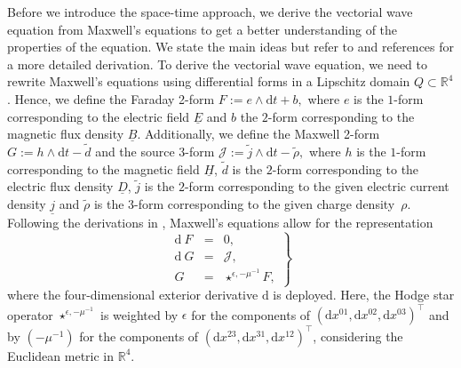 \documentclass[a4paper,11pt]{article}
\newcommand{\R}{\mathbb R}
\renewcommand{\vec}[1]{\underline{#1}}
\begin{document}
	Before we introduce the space-time approach, we derive the vectorial wave equation from Maxwell's equations to get a better understanding of the properties of the equation. We state the main ideas but refer to \cite{HauserOhm2023,stern} and references for a more detailed derivation. To derive the vectorial wave equation, we need to rewrite Maxwell's equations using differential forms in a Lipschitz domain $Q\subset\R^4$. Hence, we define the Faraday 2-form $F := e \wedge  \mathrm{d}t + b,$	where $e$ is the $1$-form corresponding to the electric field $\vec E$ and $b$ the $2$-form corresponding to the magnetic flux density $\vec B$. Additionally, we define the Maxwell 2-form $G:= {h}\wedge  \mathrm{d}t - \tilde d$ and the source 3-form $\mathcal{J}:= \tilde{j} \wedge  \mathrm{d}t - \tilde{\rho},$ where $h$ is the $1$-form corresponding to the magnetic field $\vec H$, $\tilde d$ is the $2$-form corresponding to the electric flux density $\vec D$, $\tilde{j}$ is the $2$-form corresponding to the given electric current density $\vec j$ and $\tilde{\rho}$ is the $3$-form corresponding to the given charge density~$\rho$. Following the derivations in \cite{stern}, Maxwell's equations allow for the representation
	\begin{equation}  \label{Einf:eqn:Maxwell4D}
		\left.
		\begin{array}{rcl}
			\mathrm{d}\ F &=& 0,\\
			\mathrm{d}\ G &=& \mathcal{J},\\
			G &=& \star^{\epsilon,-\mu^{-1}} F,
		\end{array}
		\right \}
	\end{equation}
	where the four-dimensional exterior derivative $\mathrm{d}$ is deployed. Here, the Hodge star operator $\star^{\epsilon,-\mu^{-1}}$ is weighted by $\epsilon$ for the components of $(\mathrm{d}x^{01},\mathrm{d}x^{02},\mathrm{d}x^{03})^\top$ and by $(-\mu^{-1})$ for the components of $(\mathrm{d}x^{23},\mathrm{d}x^{31},\mathrm{d}x^{12})^\top$, considering the Euclidean metric in $\R^4.$
\end{document}
